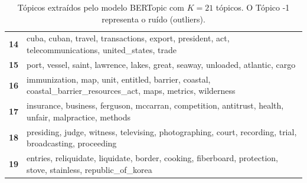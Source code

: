 \begin{table}[htpb]
\begin{tabularx}{\textwidth}{@{}l X@{}}
        \textbf{14} & cuba, cuban, travel, transactions, export, president, act, telecommunications, united\_states, trade \\
        \textbf{15} & port, vessel, saint, lawrence, lakes, great, seaway, unloaded, atlantic, cargo \\
        \textbf{16} & immunization, map, unit, entitled, barrier, coastal, coastal\_barrier\_resources\_act, maps, metrics, wilderness \\
        \textbf{17} & insurance, business, ferguson, mccarran, competition, antitrust, health, unfair, malpractice, methods \\
        \textbf{18} & presiding, judge, witness, televising, photographing, court, recording, trial, broadcasting, proceeding \\
        \textbf{19} & entries, reliquidate, liquidate, border, cooking, fiberboard, protection, stove, stainless, republic\_of\_korea \\
        \bottomrule
    \end{tabularx}
    \caption{Tópicos extraídos pelo modelo BERTopic com $K=21$ tópicos. O Tópico -1 representa o ruído (outliers).}
    \label{tab:topicos_bertopic_21}
\end{table}
